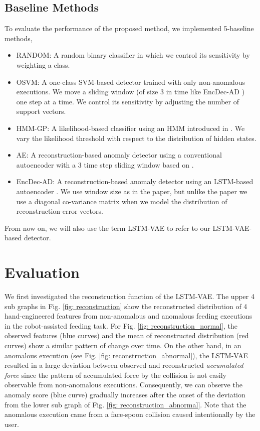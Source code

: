\documentclass[letterpaper, 10 pt, conference]{ieeeconf}
\begin{document}
\subsection{Baseline Methods}
To evaluate the performance of the proposed method, we implemented 5-baseline methods,
\begin{itemize}
\item RANDOM: A random binary classifier in which we control its sensitivity by weighting a class.
\item OSVM: A one-class SVM-based detector trained with only non-anomalous executions. We move a sliding window (of size 3 in time like EncDec-AD \cite{malhotra2016lstm}) one step at a time. We control its sensitivity by adjusting the number of support vectors.
\item HMM-GP: A likelihood-based classifier using an HMM introduced in \cite{park2017detection}. We vary the likelihood threshold with respect to the distribution of hidden states.
\item AE: A reconstruction-based anomaly detector using a conventional autoencoder with a 3 time step sliding window based on \cite{an2015variational}.
\item EncDec-AD: A reconstruction-based anomaly detector using an LSTM-based autoencoder \cite{malhotra2016lstm}. We use window size  as in the paper, but unlike the paper we use a diagonal co-variance matrix when we model the distribution of reconstruction-error vectors.
\end{itemize}
From now on, we will also use the term LSTM-VAE to refer to our LSTM-VAE-based detector.

\section{Evaluation}

We first investigated the reconstruction function of the LSTM-VAE. The upper 4 sub graphs in Fig. \ref{fig: reconstruction} show the reconstructed distribution of 4 hand-engineered features from non-anomalous and anomalous feeding executions in the robot-assisted feeding task. For Fig. \ref{fig: reconstruction_normal}, the observed features (blue curves) and the mean of reconstructed distribution (red curves) show a similar pattern of change over time. On the other hand, in an anomalous execution (see Fig. \ref{fig: reconstruction_abnormal}), the LSTM-VAE resulted in a large deviation between observed and reconstructed \textit{accumulated force} since the pattern of accumulated force by the collision is not easily observable from non-anomalous executions. Consequently, we can observe the anomaly score (blue curve) gradually increases after the onset of the deviation from the lower sub graph of Fig. \ref{fig: reconstruction_abnormal}. Note that the anomalous execution came from a face-spoon collision caused intentionally by the user.
\end{document}
